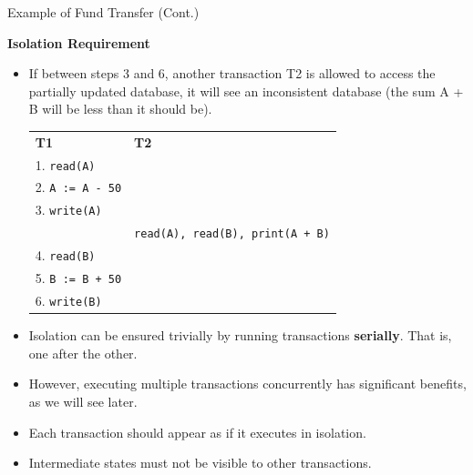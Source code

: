 \documentclass[aspectratio=169]{beamer}
\begin{document}
\begin{frame}{Example of Fund Transfer (Cont.)}

    \scriptsize
    \textbf{Isolation Requirement}
    \begin{itemize}
        \item If between steps 3 and 6, another transaction T2 is allowed to access the partially updated database, it will see an inconsistent database (the sum A + B will be less than it should be).
            \begin{tabular}{l l}
                \textbf{T1}                 & \textbf{T2} \\
                1. \texttt{read(A)}         &       \\
                2. \texttt{A := A - 50}     &       \\
                3. \texttt{write(A)}        &       \\
                                            &   \texttt{read(A), read(B), print(A + B)} \\
                4. \texttt{read(B)}         &       \\
                5. \texttt{B := B + 50}     &       \\
                6. \texttt{write(B)}        &       \\
            \end{tabular}

        \item Isolation can be ensured trivially by running transactions \textbf{serially}.  That is, one after the other.
        \item However, executing multiple transactions concurrently has significant benefits, as we will see later.
        \item Each transaction should appear as if it executes in isolation.
        \item Intermediate states must not be visible to other transactions.

    \end{itemize}
\end{frame}
\end{document}
